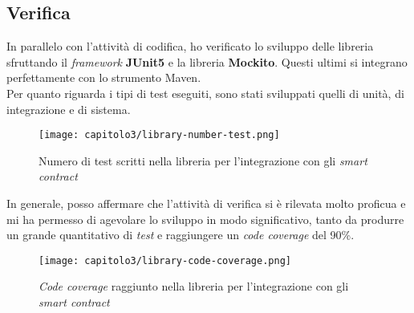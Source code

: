 
\subsection{Verifica}
In parallelo con l'attività di codifica, ho verificato lo sviluppo delle libreria sfruttando il \textit{framework} \textbf{JUnit5} e la libreria \textbf{Mockito}. Questi ultimi si integrano perfettamente con lo strumento Maven. \\

Per quanto riguarda i tipi di test eseguiti, sono stati sviluppati quelli di unità, di integrazione e di sistema.

\begin{figure}[h!]
  \centering
  \texttt{[image: capitolo3/library-number-test.png]}
  \caption{Numero di test scritti nella libreria per l'integrazione con gli \textit{smart contract}}
\end{figure}

In generale, posso affermare che l'attività di verifica si è rilevata molto proficua e mi ha permesso di agevolare lo sviluppo in modo significativo, tanto da produrre un grande quantitativo di \textit{test} e raggiungere un \textit{code coverage} del 90\%.

\begin{figure}[h!]
  \centering
  \texttt{[image: capitolo3/library-code-coverage.png]}
  \caption{\textit{Code coverage} raggiunto nella libreria per l'integrazione con gli \textit{smart contract}}
\end{figure}
